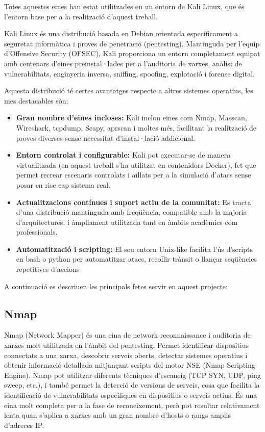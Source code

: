  Totes aquestes eines han estat utilitzades en un entorn de Kali Linux, que és l’entorn base per a la realització d’aquest treball. 
  
  Kali Linux és una distribució basada en Debian orientada específicament a seguretat informàtica i proves de penetració (pentesting). Mantinguda per l’equip d’Offensive Security (OFSEC), Kali proporciona un entorn completament equipat amb centenars d’eines preinstal·lades per a l’auditoria de xarxes, anàlisi de vulnerabilitats, enginyeria inversa, sniffing, spoofing, explotació i forense digital. \cite{kaliexp} 
  
  Aquesta distribució té certes avantatges respecte a altres sistemes operatius, les mes destacables són:
    
    \begin{itemize}
      \item \textbf{Gran nombre d’eines incloses:} Kali inclou eines com Nmap, Masscan, Wireshark, tcpdump, Scapy, aprscan i moltes més, facilitant la realització de proves diverses sense necessitat d’instal·lació addicional.
      \item \textbf{Entorn controlat i configurable:} Kali pot executar-se de manera virtualitzada (en aquest treball s'ha utilitzat en contenidors Docker), fet que permet recrear escenaris controlats i aïllats per a la simulació d’atacs sense posar en risc cap sistema real.
      \item \textbf{Actualitzacions contínues i suport actiu de la comunitat:} Es tracta d’una distribució mantinguda amb freqüència, compatible amb la majoria d’arquitectures, i àmpliament utilitzada tant en àmbits acadèmics com professionals.
      \item \textbf{Automatització i scripting:} El seu entorn Unix-like facilita l’ús d’scripts en bash o python per automatitzar atacs, recollir trànsit o llançar seqüències repetitives d’accions
    \end{itemize}  

    A continuació es descriuen les principals fetes servir en aquest projecte:

    \subsection{Nmap}
    \label{sec:NMAP}
    Nmap (Network Mapper) és una eina de network reconnaissance i auditoria de xarxes molt utilitzada en l’àmbit del pentesting. Permet identificar dispositius connectats a una xarxa, descobrir serveis oberts, detectar sistemes operatius i obtenir informació detallada mitjançant scripts del motor NSE (Nmap Scripting Engine). Nmap pot utilitzar diferents tècniques d'escaneig (TCP SYN, UDP, ping sweep, etc.), i també permet la detecció de versions de serveis, cosa que facilita la identificació de vulnerabilitats específiques en dispositius o serveis actius. És una eina molt completa per a la fase de reconeixement, però pot resultar relativament lenta quan s’aplica a xarxes amb un gran nombre d’hosts o rangs amplis d’adreces IP.


